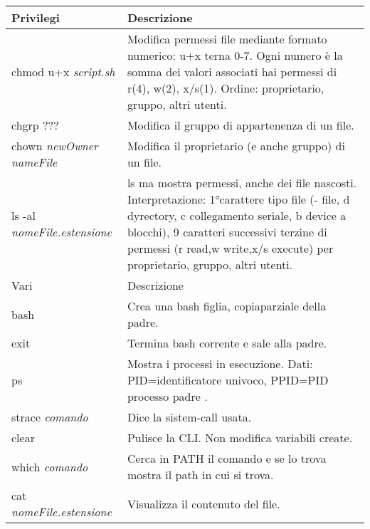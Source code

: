 \documentclass{article}
\newcommand{\sezione}[1]{\hline#1 & Descrizione\\\hline}
\begin{document}
\begin{tabularx}{\textwidth}{lX}
	\sezione{Privilegi}
	chmod u+x \textit{script.sh} & Modifica permessi file mediante formato numerico: u+x terna 0-7. Ogni numero è la somma dei valori associati hai permessi di r(4), w(2), x/s(1). Ordine: proprietario, gruppo, altri utenti.\\
	chgrp ??? & Modifica il gruppo di appartenenza di un file.\\
	chown \textit{newOwner nameFile} & Modifica il proprietario (e anche gruppo) di un file.\\
	ls -al \textit{nomeFile.estensione} & ls ma mostra permessi, anche dei file nascosti. Interpretazione: 1°carattere tipo file (- file, d dyrectory, c collegamento seriale, b device a blocchi), 9 caratteri successivi terzine di permessi (r read,w write,x/s execute) per proprietario, gruppo, altri utenti. \\

	\sezione{Vari}
	bash & Crea una bash figlia, copiaparziale della padre.\\
	exit & Termina bash corrente e sale alla padre.\\
	ps & Mostra i processi in esecuzione. Dati: PID=identificatore univoco, PPID=PID processo padre .\\
	strace \textit{comando} & Dice la sistem-call usata.\\
	clear & Pulisce la CLI. Non modifica variabili create.\\
	which \textit{comando} & Cerca in PATH il comando e se lo trova mostra il path in cui si trova. \\
	cat \textit{nomeFile.estensione} & Visualizza il contenuto del file.\\
	\hline
	\end{tabularx}
\end{document}
